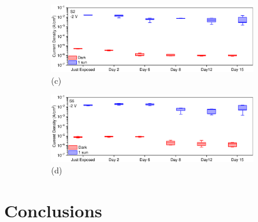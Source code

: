 \begin{figure}[htbp]
    \begin{subfigure}[t]{0.99\textwidth}
        \centering
        \includegraphics[width=\textwidth]{chapters/stability/imeges/AP44_2_Thesis.pdf} %
        \caption*{(c)}
    \end{subfigure}
    \hfill
    \begin{subfigure}[t]{0.99\textwidth}
        \centering
        \includegraphics[width=\textwidth]{chapters/stability/imeges/AP44_4_Thesis.pdf} %
        \caption*{(d)}
    \end{subfigure}
    \caption{}
    \label{}
\end{figure}

\section{Conclusions}

\cleardoublepage

